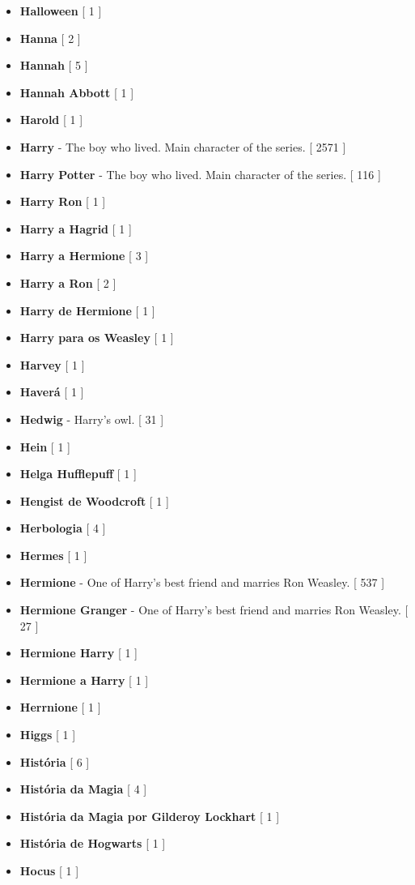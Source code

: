 \documentclass[a4paper]{article}
\begin{document}
{\begin{itemize}
	\item \textbf{Halloween} [ 1 ]
	\item \textbf{Hanna} [ 2 ]
	\item \textbf{Hannah} [ 5 ]
	\item \textbf{Hannah Abbott} [ 1 ]
	\item \textbf{Harold} [ 1 ]
	\item \textbf{Harry} - The boy who lived. Main character of the series. [ 2571 ]
	\item \textbf{Harry Potter} - The boy who lived. Main character of the series. [ 116 ]
	\item \textbf{Harry Ron} [ 1 ]
	\item \textbf{Harry a Hagrid} [ 1 ]
	\item \textbf{Harry a Hermione} [ 3 ]
	\item \textbf{Harry a Ron} [ 2 ]
	\item \textbf{Harry de Hermione} [ 1 ]
	\item \textbf{Harry para os Weasley} [ 1 ]
	\item \textbf{Harvey} [ 1 ]
	\item \textbf{Haverá} [ 1 ]
	\item \textbf{Hedwig} - Harry's owl. [ 31 ]
	\item \textbf{Hein} [ 1 ]
	\item \textbf{Helga Hufflepuff} [ 1 ]
	\item \textbf{Hengist de Woodcroft} [ 1 ]
	\item \textbf{Herbologia} [ 4 ]
	\item \textbf{Hermes} [ 1 ]
	\item \textbf{Hermione} - One of Harry's best friend and marries Ron Weasley. [ 537 ]
	\item \textbf{Hermione Granger} - One of Harry's best friend and marries Ron Weasley. [ 27 ]
	\item \textbf{Hermione Harry} [ 1 ]
	\item \textbf{Hermione a Harry} [ 1 ]
	\item \textbf{Herrnione} [ 1 ]
	\item \textbf{Higgs} [ 1 ]
	\item \textbf{História} [ 6 ]
	\item \textbf{História da Magia} [ 4 ]
	\item \textbf{História da Magia por Gilderoy Lockhart} [ 1 ]
	\item \textbf{História de Hogwarts} [ 1 ]
	\item \textbf{Hocus} [ 1 ]

\end{itemize}}
\end{document}
